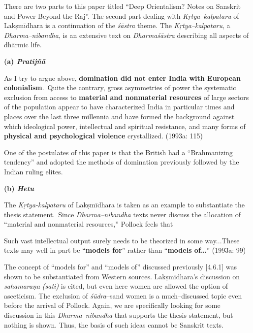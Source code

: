 \vspace{-.3cm}

There are two parts to this paper titled “Deep Orientalism? Notes on Sanskrit and Power Beyond the Raj”. The second part dealing with \textit{Kṛtya–kalpataru} of Lakṣmīdhara is a continuation of the \textit{śāstra} theme. The \textit{Kṛtya–kalpataru}, a \textit{Dharma–nibandha}, is an extensive text on \textit{Dharmaśāstra} describing all aspects of dhārmic life.

\textbf{(a) \textit{Pratijñā }}

\begin{myquote}
As I try to argue above, \textbf{domination did not enter India with European colonialism}.~Quite the contrary, gross asymmetries of power the systematic exclusion from access to \textbf{material and nonmaterial resources} of large sectors of the population appear to have characterized India in particular times and places over the last three millennia and have formed the background against which ideological power, intellectual and spiritual resistance, and many forms of \textbf{physical and psychological violence} crystallized. (1993a: 115)
\end{myquote}

One of the postulates of this paper is that the British had a “Brahmanizing tendency” and adopted the methods of domination previously followed by the Indian ruling elites.

\textbf{(b) \textit{Hetu}}

The \textit{Kṛtya-kalpataru} of Lakṣmīdhara is taken as an example to substantiate the thesis statement.~Since \textit{Dharma–nibandha} texts never discuss the allocation of “material and nonmaterial resources,” Pollock feels that

\begin{myquote}
Such vast intellectual output surely needs to be theorized in some way...These texts may well in part be ``\textbf{models for}'' rather than ``\textbf{models of…}” (1993a: 99)
\end{myquote}

The concept of “models for” and “models of” discussed previously [4.6.1] was shown to be substantiated from Western sources. Lakṣmīdhara’s discussion on \textit{sahamaraṇa} \textit{(sati)} is cited, but even here women are allowed the option of asceticism. The exclusion of \textit{śūdra}–s\break and women is a much–discussed topic even before the arrival of Pollock. Again, we are specifically looking for some discussion in this \textit{Dharma–nibandha} that supports the thesis statement, but nothing is shown. Thus, the basis of such ideas cannot be Sanskrit texts.

